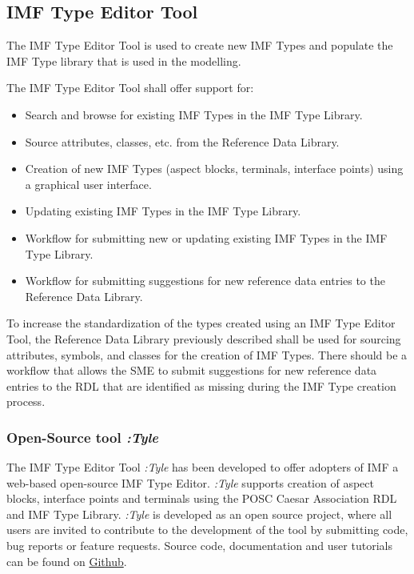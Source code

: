 \subsection{IMF Type Editor Tool}
The IMF Type Editor Tool is used to create new IMF Types and populate the IMF Type library
that is used in the modelling.

The IMF Type Editor Tool shall offer support for:

\begin{itemize}
  \item Search and browse for existing IMF Types in the IMF Type Library.
  \item Source attributes, classes, etc. from the Reference Data Library.
  \item Creation of new IMF Types (aspect blocks, terminals, interface points) using a graphical user interface.
  \item Updating existing IMF Types in the IMF Type Library.
  \item Workflow for submitting new or updating existing IMF Types in the IMF Type Library.
  \item Workflow for submitting suggestions for new reference data entries to the Reference Data Library.
\end{itemize}
To increase the standardization of the types created using an IMF Type Editor Tool, the Reference Data Library
previously described shall be used for sourcing attributes, symbols, and classes for the creation of IMF Types. There
should be a workflow that allows the SME to submit suggestions for new reference data entries to the RDL that are
identified as missing during the IMF Type creation process.

\subsubsection{Open-Source tool \emph{:Tyle}}

The IMF Type Editor Tool \emph{:Tyle }has been developed to offer adopters of IMF a web-based open-source IMF Type
Editor. \emph{:Tyle }supports creation of aspect blocks, interface points and terminals using the POSC Caesar
Association RDL and IMF Type Library. \emph{:Tyle} is developed as an open source project, where all users are
invited to contribute to the development of the tool by submitting code, bug reports or feature requests. Source
code, documentation and user tutorials can be found on
\href{https://github.com/mimir-org/typelibrary}{Github}.

